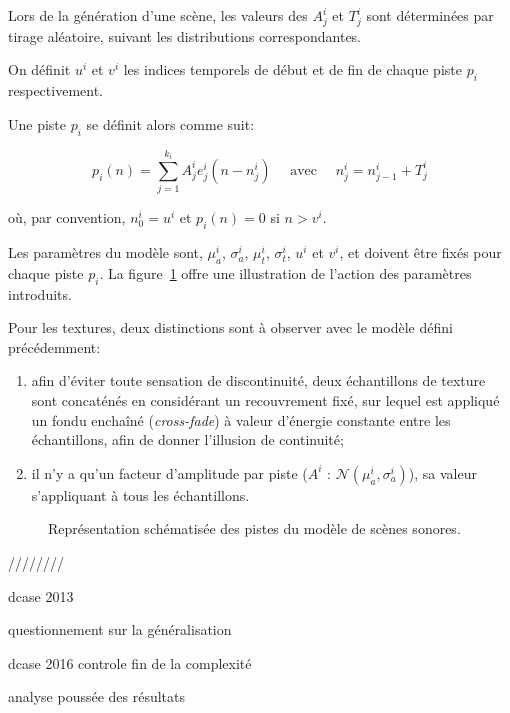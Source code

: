 Lors de la génération d'une scène, les valeurs des $A^i_j$ et $T_j^i$ sont déterminées par tirage aléatoire, suivant les distributions correspondantes.

On définit $u^i$ et $v^i$ les indices temporels de début et de fin de chaque piste $p_i$ respectivement.

Une piste $p_i$ se définit alors comme suit:

\begin{equation}
\label{eq:ch4_eq2}
p_{i}(n)= \sum_{j=1}^{k_i} A_j^i e_j^i(n-n_j^i) \quad \textrm{ avec } \quad n_j^i=n_{j-1}^i + T_j^i
\end{equation}

où, par convention, $n^i_0=u^i$ et $p_i(n)=0$ si $n>v^i$.

Les paramètres du modèle sont, $\mu_a^i$, $\sigma_a^i$, $\mu_t^i$, $\sigma_t^i$, $u^i$ et $v^i$, et doivent être fixés pour chaque piste $p_i$. La figure~\ref{fig:modelSequence} offre une illustration de l'action des paramètres introduits.

Pour les textures, deux distinctions sont à observer avec le modèle défini précédemment:

\begin{enumerate}
\item afin d'éviter toute sensation de discontinuité, deux échantillons de texture sont concaténés en considérant un recouvrement fixé, sur lequel est appliqué un fondu enchaîné (\emph{cross-fade}) à valeur d'énergie constante entre les échantillons, afin de donner l'illusion de continuité;
\item il n'y a qu'un facteur d'amplitude par piste ($A^i \textrm{ : } \mathcal{N}(\mu_a^{i},\sigma_a^{i})$), sa valeur s'appliquant à tous les échantillons.
\end{enumerate}

\begin{figure}[t]
        \graphicspath{{figures/}}
        \def\svgwidth{\linewidth}
        
       \caption{Représentation schématisée des pistes du modèle de scènes sonores.}\label{fig:modelSequence}
\end{figure}

////////

dcase 2013 \cite{stowellhal-01253912}

questionnement sur la généralisation \cite{lafayhal-01111381}

dcase 2016 controle fin de la complexité

analyse poussée des résultats \cite{lafayhal-01635414}

